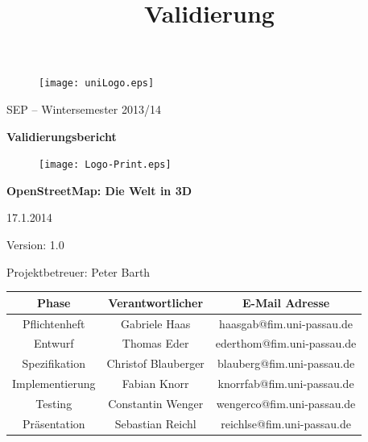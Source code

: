 \documentclass[10pt]{scrreprt}
\begin{document}
\thispagestyle{empty}
\sffamily
 
\title{Validierung}

\begin{figure}
\begin{flushright}
	\texttt{[image: uniLogo.eps]}
\vspace{2.0 cm}
\end{flushright}
\end{figure}

\begin{center}
\vspace{2.0 cm}
{\LARGE SEP – Wintersemester 2013/14}

\vspace{1.0 cm}
\textbf{{\Huge Validierungsbericht}}

\vspace{0.4 cm}
\begin{figure}[!htb]
\begin{center}
	\texttt{[image: Logo-Print.eps]}
\end{center}
\end{figure}

\vspace{0.2 cm}
\textbf{{\huge OpenStreetMap: Die Welt in 3D}}

\vspace{1.5 cm}
17.1.2014

\vspace{0.5 cm}
Version: 1.0

\vspace{1.5 cm}
{\Large Projektbetreuer: Peter Barth}

\vspace{1.5 cm}
\begin{tabular}{|c|c|c|}
\hline 
\rule[-1ex]{0pt}{4ex} \textbf{Phase} & \textbf{Verantwortlicher} & \textbf{E-Mail Adresse} \\ 
\hline  \hline
\rule[-1ex]{0pt}{4ex} Pflichtenheft & Gabriele Haas & haasgab@fim.uni-passau.de \\ 
\hline  \hline
\rule[-1ex]{0pt}{4ex} Entwurf & Thomas Eder & ederthom@fim.uni-passau.de \\ 
\hline  \hline
\rule[-1ex]{0pt}{4ex} Spezifikation & Christof Blauberger & blauberg@fim.uni-passau.de \\ 
\hline  \hline
\rule[-1ex]{0pt}{4ex} Implementierung & Fabian Knorr & knorrfab@fim.uni-passau.de \\ 
\hline \hline 
\rule[-1ex]{0pt}{4ex} Testing & Constantin Wenger & wengerco@fim.uni-passau.de \\ 
\hline  \hline
\rule[-1ex]{0pt}{4ex} Präsentation & Sebastian Reichl & reichlse@fim.uni-passau.de \\ 
\hline 
\end{tabular}

\end{center}
\end{document}
